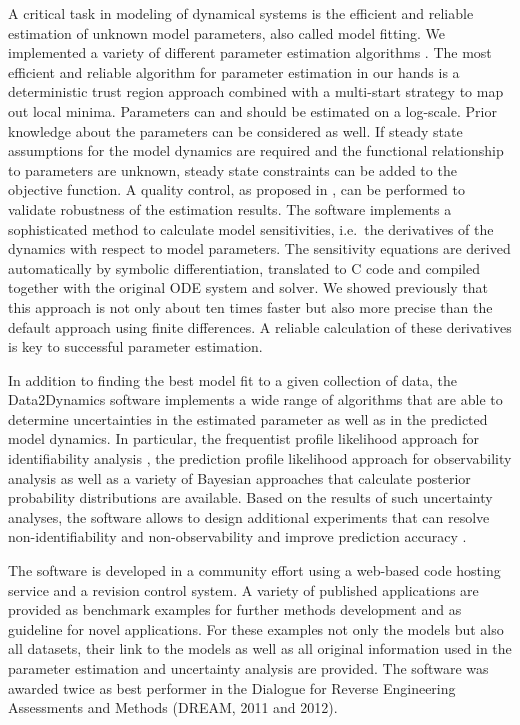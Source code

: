 \documentclass{bioinfo}
\begin{document}
A critical task in modeling of dynamical systems is the efficient and reliable estimation of 
unknown model parameters, also called model fitting. 
We implemented a variety of different 
parameter estimation algorithms \citep{Raue:2012zt}. The most efficient and reliable 
algorithm for parameter estimation in our hands is a deterministic trust region approach 
combined with a multi-start strategy to map out local minima. Parameters can and should 
be estimated on a log-scale. Prior knowledge about the parameters can be considered as 
well. If steady state assumptions for the model dynamics are required and the functional 
relationship to parameters are unknown, steady state constraints can be added to the 
objective function. A quality control, as proposed in 
\citet{Raue:2012zt}, can be performed to validate robustness of the estimation results. The 
software implements a sophisticated method to calculate model sensitivities, i.e.~the 
derivatives of the dynamics with respect to model parameters. The sensitivity equations 
are derived automatically by symbolic differentiation, translated to C code and compiled 
together with the original ODE system and solver. We showed previously 
\citep{Raue:2012zt} that this approach is not only about ten times faster but also more 
precise than the default approach using finite differences. A reliable calculation of these 
derivatives is key to successful parameter estimation. 

In addition to finding the best model fit to a given collection of data, the Data2Dynamics 
software implements a wide range of algorithms that are able to determine uncertainties 
in the estimated parameter as well as in the predicted model dynamics. In particular, the 
frequentist profile likelihood approach for identifiability analysis \citep{Raue:2009ec}, the 
prediction profile likelihood approach for observability analysis \citep{Kreutz:2011kx} as 
well as a variety of Bayesian approaches \citep{Raue:2013fk, Hug:2012fk} that calculate 
posterior probability distributions are available. Based on the results of such uncertainty 
analyses, the software allows to design additional experiments \citep{Steiert:2012fk} that 
can resolve non-identifiability and non-observability \citep{Raue:2010fk} 
and improve prediction accuracy \citep{Kreutz:2013uq}.

The software is developed in a community effort using a web-based 
code hosting service 
and a revision control system. A variety of published applications are provided as benchmark examples for further methods development and as guideline for novel applications. For these examples not only the models but also all datasets, their link to the models as well as all original information used in the parameter estimation and uncertainty analysis are provided. The software was awarded twice as best performer in the Dialogue for Reverse Engineering Assessments and Methods (DREAM, 2011 and 2012).
\end{document}
